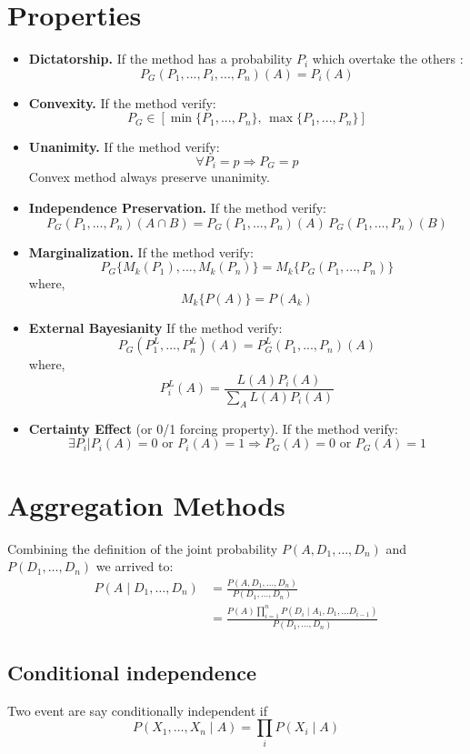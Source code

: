 \documentclass[twocolumn]{article}
\numberwithin{equation}{section}
\begin{document}
\section{Properties}
\begin{itemize}
	\item \textbf{Dictatorship.} If the method has a probability $P_i$ which overtake the others :
$$P_G(P_1,...,P_i,...,P_n)(A)=P_i(A)$$
	\item \textbf{Convexity.} If the method verify:
$$P_G \in \left[\min\{P_1,...,P_n\},\, \max\{P_1,...,P_n\}\right] $$
	\item \textbf{Unanimity.} If the method verify:
$$ \forall P_i=p \Rightarrow P_G = p $$
Convex method always preserve unanimity.
	\item \textbf{Independence Preservation.} If the method verify:
$$P_G(P_1,...,P_n)(A\cap B)=P_G(P_1,...,P_n)(A) \, P_G(P_1,...,P_n)(B)$$
	\item \textbf{Marginalization.} If the method verify:
$$P_G\{M_k(P_1),... ,M_k(P_n)\}=M_k\{P_G(P_1,...,P_n)\}$$ 
where,
$$M_k\{P(A)\}=P(A_k)$$

	\item \textbf{External Bayesianity} If the method verify:
$$ P_G(P^L_1 ,...,P^L_n)(A)=P^L_G(P_1,...,P_n)(A) $$
where,
$$P^L_i(A)=\frac{L(A)P_i(A)}{\sum_A L(A) P_i(A)}$$
	\item \textbf{Certainty Effect} (or 0/1 forcing property).  If the method verify:
$$\exists P_i | P_i(A)=0 \text{ or } P_i(A)=1 \Rightarrow P_G(A)=0 \text{ or } P_G(A)=1 $$
\end{itemize}

\section{Aggregation Methods}
Combining the definition of the joint probability $P(A, D_1,\ldots,D_n)$ and $P(D_1,\ldots,D_n)$ we arrived to:
\begin{align*} 
P(A \mid D_1,\ldots,D_n)	&= \frac{P(A, D_1,\ldots,D_n)}{P(D_1,\ldots,D_n)} \\
							&= \frac{P(A) \prod_{i=1}^n  P(D_i \mid A_1, D_1, \ldots D_{i-1}) }{P(D_1,\ldots,D_n)}
\end{align*}

	\subsection{Conditional independence}
Two event are say conditionally independent if 
$$P(X_1,\ldots,X_n \mid A) = \prod_i P(X_i \mid A)$$
\end{document}
